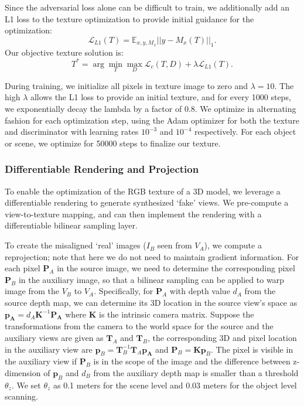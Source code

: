 %
Since the adversarial loss alone can be difficult to train, we additionally add an L1 loss to the texture optimization to provide initial guidance for the optimization:
%
\begin{equation}
\mathcal{L}_{L1}(T) = \mathbb{E}_{x,y,M_x} ||y - M_x(T)||_1.
\end{equation}
Our objective texture solution is:
\begin{equation}
    T^* = \arg \min_{T} \max_{D} \mathcal{L}_c(T,D) + \lambda \mathcal{L}_{L1}(T).
\end{equation}

%
During training, we initialize all pixels in texture image to zero and $\lambda=10$.
%
The high $\lambda$ allows the L1 loss to provide an initial texture, and for every 1000 steps, we exponentially decay the lambda by a factor of $0.8$.
%
We optimize in alternating fashion for each optimization step, using the Adam optimizer for both the texture and discriminator with learning rates $10^{-3}$ and $10^{-4}$ respectively.
%
For each object or scene, we optimize for 50000 steps to finalize our texture. 
%

\subsubsection{Differentiable Rendering and Projection}
%
To enable the optimization of the RGB texture of a 3D model, we leverage a differentiable rendering to generate synthesized `fake' views.
We pre-compute a view-to-texture mapping, and can then implement the rendering with a differentiable bilinear sampling layer. 

To create the misaligned `real' images ($I_B$ seen from $V_A$), we compute a reprojection; note that here we do not need to maintain gradient information.
For each pixel $\mathbf{P}_A$ in the source image, we need to determine the corresponding pixel $\mathbf{P}_B$ in the auxiliary image, so that a bilinear sampling can be applied to warp image from the $V_B$ to $V_A$. 
Specifically, for $\mathbf{P}_A$ with depth value $d_A$ from the source depth map, we can determine its 3D location in the source view's space as $\mathbf{p_A}=d_A\mathbf{K}^{-1}\mathbf{P_A}$ where $\mathbf{K}$ is the intrinsic camera matrix. 
Suppose the transformations from the camera to the world space for the source and the auxiliary views are given as $\mathbf{T}_A$ and $\mathbf{T}_B$, the corresponding 3D and pixel location in the auxiliary view are $\mathbf{p}_B=\mathbf{T}_B^{-1}\mathbf{T}_A\mathbf{p_A}$ and $\mathbf{P}_B=\mathbf{K}\mathbf{p}_B$. 
The pixel is visible in the auxiliary view if $\mathbf{P}_B$ is in the scope of the image and the difference between z-dimension of $\mathbf{p}_B$ and $d_B$ from the auxiliary depth map is smaller than a threshold $\theta_z$. We set $\theta_z$ as 0.1 meters for the scene level and 0.03 meters for the object level scanning.

